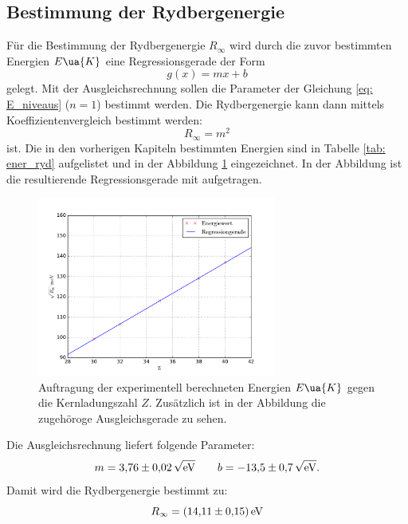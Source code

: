 \subsection{Bestimmung der Rydbergenergie}
Für die Bestimmung der Rydbergenergie $R_\infty$ wird durch die zuvor %
bestimmten Energien $E\ua{K}$ eine Regressionsgerade der Form
\begin{equation*}
  g(x)=mx+b
\end{equation*}
gelegt. Mit der Ausgleichsrechnung sollen die Parameter der Gleichung \eqref{eq: E_niveaus} ($n=1$)
bestimmt werden.
Die Rydbergenergie kann dann mittels Koeffizientenvergleich bestimmt werden:
\begin{equation*}
  R_\infty=m^2
\end{equation*}
ist. %
Die in den vorherigen Kapiteln bestimmten Energien sind in Tabelle \ref{tab: ener_ryd} aufgelistet %
und in der Abbildung \ref{fig: ryd_ener} eingezeichnet. In der Abbildung ist %
die resultierende Regressionsgerade mit aufgetragen.

\begin{figure}
  \centering
  \includegraphics[width=0.7\textwidth]{../Messdaten/energie_z.pdf}
  \caption{Auftragung der experimentell berechneten Energien $E\ua{K}$ gegen die Kernladungszahl $Z$. Zusätzlich ist in der Abbildung die zugehöroge Ausgleichsgerade zu sehen.} %
  \label{fig: ryd_ener}
\end{figure}
Die Ausgleichsrechnung liefert folgende Parameter:
\begin{equation*}
m=\num{3.76\pm0.02}\,\sqrt{\si{\eV}} \qquad b=\num{-13.5\pm0.7}\,\sqrt{\si{\eV}}.
\end{equation*}
Damit wird die Rydbergenergie bestimmt zu:
\begin{equation}
  R_\infty=\SI{14.11\pm0.15}{\eV}
\end{equation}
\FloatBarrier
